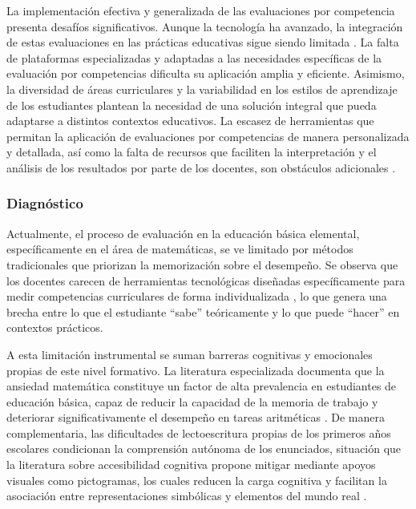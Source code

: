 La implementación efectiva y generalizada de las evaluaciones por competencia presenta desafíos significativos. Aunque la tecnología ha avanzado, la integración de estas evaluaciones en las prácticas educativas sigue siendo limitada \cite{velezvelez2024curriculo,niss2019math}. La falta de plataformas especializadas y adaptadas a las necesidades específicas de la evaluación por competencias dificulta su aplicación amplia y eficiente. Asimismo, la diversidad de áreas curriculares y la variabilidad en los estilos de aprendizaje de los estudiantes plantean la necesidad de una solución integral que pueda adaptarse a distintos contextos educativos. La escasez de herramientas que permitan la aplicación de evaluaciones por competencias de manera personalizada y detallada, así como la falta de recursos que faciliten la interpretación y el análisis de los resultados por parte de los docentes, son obstáculos adicionales \cite{gonzalez2021ai,maksimchuk2025genai}.

\subsubsection{Diagnóstico}

Actualmente, el proceso de evaluación en la educación básica elemental, específicamente en el área de matemáticas, se ve limitado por métodos tradicionales que priorizan la memorización sobre el desempeño. Se observa que los docentes carecen de herramientas tecnológicas diseñadas específicamente para medir competencias curriculares de forma individualizada \cite{velezvelez2024curriculo,evans2020cbe}, lo que genera una brecha entre lo que el estudiante ``sabe'' teóricamente y lo que puede ``hacer'' en contextos prácticos.

A esta limitación instrumental se suman barreras cognitivas y emocionales propias de este nivel formativo. La literatura especializada documenta que la ansiedad matemática constituye un factor de alta prevalencia en estudiantes de educación básica, capaz de reducir la capacidad de la memoria de trabajo y deteriorar significativamente el desempeño en tareas aritméticas \cite{passolunghi2016math,ramirez2018mathanxiety,mitchell2022prevalence}. De manera complementaria, las dificultades de lectoescritura propias de los primeros años escolares condicionan la comprensión autónoma de los enunciados, situación que la literatura sobre accesibilidad cognitiva propone mitigar mediante apoyos visuales como pictogramas, los cuales reducen la carga cognitiva y facilitan la asociación entre representaciones simbólicas y elementos del mundo real \cite{mayer2014multimedia,guillomia2021cognitive}.

